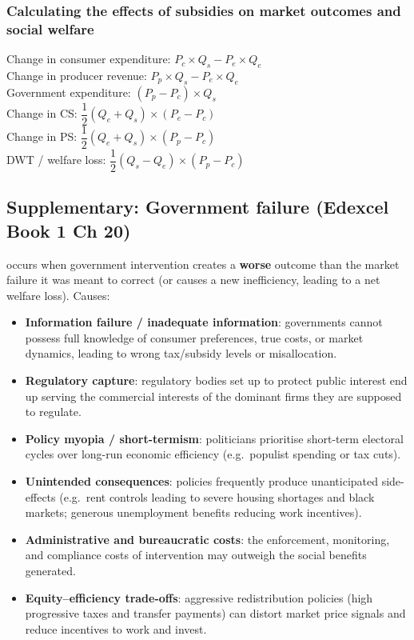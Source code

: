\subsubsection*{Calculating the effects of subsidies on market outcomes and social welfare}
Change in consumer expenditure: $P_c\times Q_s-P_e\times Q_e$\\
Change in producer revenue: $P_p\times Q_s-P_e\times Q_e$\\
Government expenditure: $(P_p-P_c)\times Q_s$\\
Change in CS: $\dfrac{1}{2}(Q_e+Q_s)\times (P_e-P_c)$\\
Change in PS: $\dfrac{1}{2}(Q_e+Q_s)\times (P_p-P_c)$\\
DWT / welfare loss: $\dfrac{1}{2}(Q_s-Q_e)\times (P_p-P_c)$

\subsection{Supplementary: Government failure (Edexcel Book 1 Ch 20)}
 occurs when government intervention creates a \textbf{worse} outcome than the market failure it was meant to correct (or causes a new inefficiency, leading to a net welfare loss). Causes:
\begin{itemize}
  \item \textbf{Information failure / inadequate information}: governments cannot possess full knowledge of consumer preferences, true costs, or market dynamics, leading to wrong tax/subsidy levels or misallocation.
  \item \textbf{Regulatory capture}: regulatory bodies set up to protect public interest end up serving the commercial interests of the dominant firms they are supposed to regulate.
  \item \textbf{Policy myopia / short-termism}: politicians prioritise short-term electoral cycles over long-run economic efficiency (e.g.\ populist spending or tax cuts).
  \item \textbf{Unintended consequences}: policies frequently produce unanticipated side-effects (e.g.\ rent controls leading to severe housing shortages and black markets; generous unemployment benefits reducing work incentives).
  \item \textbf{Administrative and bureaucratic costs}: the enforcement, monitoring, and compliance costs of intervention may outweigh the social benefits generated.
  \item \textbf{Equity--efficiency trade-offs}: aggressive redistribution policies (high progressive taxes and transfer payments) can distort market price signals and reduce incentives to work and invest.
\end{itemize}
